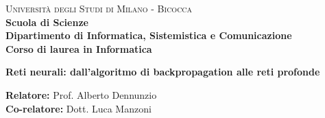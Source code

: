 


    
    \begin{titlepage}
        
        \noindent
        \begin{minipage}[t]{0.19\textwidth}
        \end{minipage}
        \begin{minipage}[t]{0.81\textwidth}
        {
                {\textsc{Università degli Studi di Milano - Bicocca}} \\
                \textbf{Scuola di Scienze} \\
                \textbf{Dipartimento di Informatica, Sistemistica e Comunicazione} \\
                \textbf{Corso di laurea in Informatica} \\
                \par
        }
        \end{minipage}
        
	\vspace{40mm}
        
	\begin{center}
            {\LARGE{
                    \textbf{Reti neurali: dall'algoritmo di backpropagation alle reti profonde}
                    \par
            }}
        \end{center}
        
        \vspace{48mm}

        \noindent
        {\large \textbf{Relatore:} Prof. Alberto Dennunzio } \\

        \noindent
        {\large \textbf{Co-relatore:} Dott. Luca Manzoni}
        
        \vspace{14mm}


\end{titlepage}
